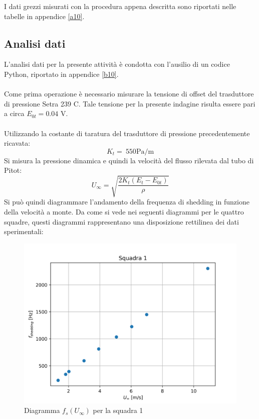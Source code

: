 \noindent I dati grezzi misurati con la procedura appena descritta sono riportati nelle tabelle in appendice \ref{a10}.

\subsection{Analisi dati}
L'analisi dati per la presente attività è condotta con l'ausilio di un codice Python, riportato in appendice \ref{b10}.\\\\
Come prima operazione è necessario misurare la tensione di offset del trasduttore di pressione Setra 239 C. Tale tensione per la presente indagine risulta essere pari a circa $E_{0t}=0.04$ V.\\\\
Utilizzando la costante di taratura del trasduttore di pressione precedentemente ricavata:
\begin{equation*}
    K_t =\ 550 \text{Pa/m}
\end{equation*}
Si misura la pressione dinamica e quindi la velocità del flusso rilevata dal tubo di Pitot:
\begin{equation*}
    U_{\infty} = \sqrt{\frac{2K_t(E_{t}-E_{0t})}\rho}
\end{equation*}
Si può quindi diagrammare l'andamento della frequenza di shedding in funzione della velocità a monte. Da come si vede nei seguenti diagrammi per le quattro squadre, questi diagrammi rappresentano una disposizione rettilinea dei dati sperimentali:
\begin{figure}[H]
    \centering
    \includegraphics[width=.9\textwidth]{images/10/sq1.png}
    \caption{Diagramma $f_s(U_\infty)$ per la squadra 1}
\end{figure}
